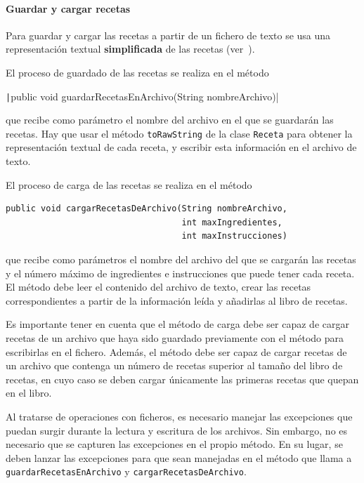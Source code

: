 \documentclass[
    a4paper, %
    12pt, %
]{CSSullivanBusinessReport}
\begin{document}
\paragraph{Guardar y cargar recetas}

Para guardar y cargar las recetas a partir de un fichero de texto se usa una representación textual \textbf{simplificada} de las recetas (ver~).

El proceso de guardado de las recetas se realiza en el método

\texttt|public void guardarRecetasEnArchivo(String nombreArchivo)|

que recibe como parámetro el nombre del archivo en el que se guardarán las recetas. Hay que usar el método \texttt{toRawString} de la clase \texttt{Receta} para obtener la representación textual de cada receta, y escribir esta información en el archivo de texto.

El proceso de carga de las recetas se realiza en el método

\begin{verbatim}
public void cargarRecetasDeArchivo(String nombreArchivo, 
                                   int maxIngredientes,
                                   int maxInstrucciones)
\end{verbatim}

que recibe como parámetros el nombre del archivo del que se cargarán las recetas y el número máximo de ingredientes e instrucciones que puede tener cada receta. El método debe leer el contenido del archivo de texto, crear las recetas correspondientes a partir de la información leída y añadirlas al libro de recetas.

Es importante tener en cuenta que el método de carga debe ser capaz de cargar recetas de un archivo que haya sido guardado previamente con el método para escribirlas en el fichero. Además, el método debe ser capaz de cargar recetas de un archivo que contenga un número de recetas superior al tamaño del libro de recetas, en cuyo caso se deben cargar únicamente las primeras recetas que quepan en el libro.

Al tratarse de operaciones con ficheros, es necesario manejar las excepciones que puedan surgir durante la lectura y escritura de los archivos. Sin embargo, no es necesario que se capturen las excepciones en el propio método. En su lugar, se deben lanzar las excepciones para que sean manejadas en el método que llama a \texttt{guardarRecetasEnArchivo} y \texttt{cargarRecetasDeArchivo}.
\end{document}
